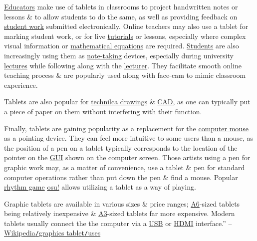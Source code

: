 \documentclass[oneside]{book}
\numberwithin{equation}{section}
\begin{document}
\href{https://en.wikipedia.org/wiki/Educator}{Educators} make use of tablets in classrooms to project handwritten notes or lessons \& to allow students to do the same, as well as providing feedback on \href{https://en.wikipedia.org/wiki/Homework}{student work} submitted electronically. Online teachers may also use a tablet for marking student work, or for live \href{https://en.wikipedia.org/wiki/Tutorial}{tutorials} or lessons, especially where complex visual information or \href{https://en.wikipedia.org/wiki/Mathematical_equation}{mathematical equations} are required. \href{https://en.wikipedia.org/wiki/Student}{Students} are also increasingly using them as \href{https://en.wikipedia.org/wiki/Note-taking}{note-taking} devices, especially during university \href{https://en.wikipedia.org/wiki/Lecture}{lectures} while following along with the \href{https://en.wikipedia.org/wiki/Lecturer}{lecturer}. They facilitate smooth online teaching process \& are popularly used along with face-cam to mimic classroom experience.

Tablets are also popular for \href{https://en.wikipedia.org/wiki/Technical_drawing}{technilca drawings} \& \href{https://en.wikipedia.org/wiki/Computer-aided_design}{CAD}, as one can typically put a piece of paper on them without interfering with their function.

Finally, tablets are gaining popularity as a replacement for the \href{https://en.wikipedia.org/wiki/Computer_mouse}{computer mouse} as a pointing device. They can feel more intuitive to some users than a mouse, as the position of a pen on a tablet typically corresponds to the location of the pointer on the \href{https://en.wikipedia.org/wiki/GUI}{GUI} shown on the computer screen. Those artists using a pen for graphic work may, as a matter of convenience, use a tablet \& pen for standard computer operations rather than put down the pen \& find a mouse. Popular \href{https://en.wikipedia.org/wiki/Rhythm_game}{rhythm game} \href{https://en.wikipedia.org/wiki/Osu!}{osu!} allows utilizing a tablet as a way of playing.

Graphic tablets are available in various sizes \& price ranges; \href{https://en.wikipedia.org/wiki/ISO_216}{A6}-sized tablets being relatively inexpensive \& \href{https://en.wikipedia.org/wiki/ISO_216}{A3}-sized tablets far more expensive. Modern tablets usually connect the the computer via a \href{https://en.wikipedia.org/wiki/Universal_Serial_Bus}{USB} or \href{https://en.wikipedia.org/wiki/HDMI}{HDMI} interface.'' -- \href{https://en.wikipedia.org/wiki/Graphics_tablet#Uses}{Wikipedia\texttt{/}graphics tablet\texttt{/}uses}
\end{document}
